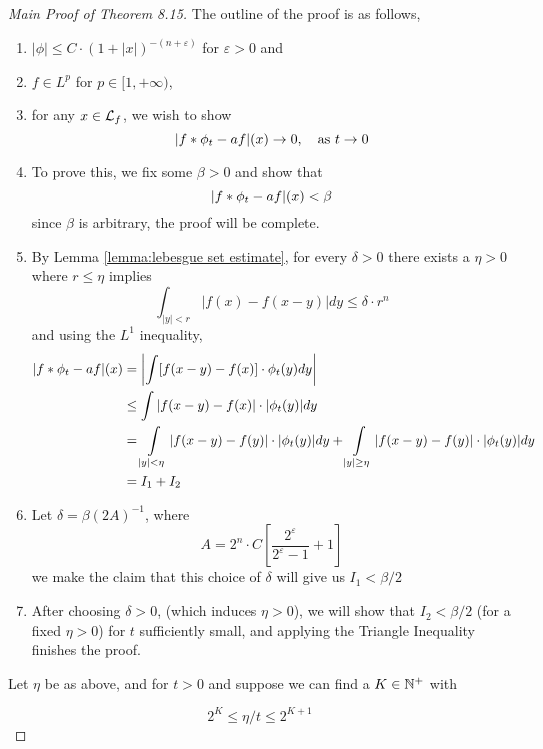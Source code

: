 \documentclass[../../main.tex]{subfiles}
\begin{document}
\begin{proof}[Main Proof of Theorem 8.15]
    The outline of the proof is as follows,
    \begin{enumerate}
        \item $|\phi|\leq C\cdot (1+|x|)^{-(n+\varepsilon)}$ for $\varepsilon>0$ and
        
        \item $f\in L^p$ for $p\in[1,+\infty)$,
        
        \item for any $x\in\mathcal{L}_f$, we wish to show \[|f\ast\phi_t - af|(x)\to 0,\quad\text{as }t \to 0\]
        
        \item To prove this, we fix some $\beta>0$ and show that\[|f\ast\phi_t - af|(x)<\beta\]
        since $\beta$ is arbitrary, the proof will be complete.

        \item By Lemma \ref{lemma:lebesgue set estimate}, for every $\delta>0$ there exists a $\eta>0$ where $r\leq \eta$ implies
        \[\int_{|y|<r}|f(x)-f(x-y)|dy\leq\delta\cdot r^n\] and using the $L^1$ inequality,
        \begin{align*}|f\ast\phi_t-af|(x)&=\left|\int [f(x-y)-f(x)]\cdot\phi_t(y)dy\right|\\
        &\leq\int |f(x-y)-f(x)|\cdot|\phi_t(y)|dy\\
        &=\int\limits_{|y|<\eta} |f(x-y)-f(y)|\cdot|\phi_t(y)|dy + \int\limits_{|y|\geq\eta} |f(x-y)-f(y)|\cdot|\phi_t(y)|dy\\
        &=I_1 +I_2
        \end{align*}
        
        \item Let $\delta = \beta(2A)^{-1}$, where 
        \[A = 2^n\cdot C\left[\dfrac{2^\varepsilon}{2^\varepsilon-1}+1\right]\]
        we make the claim that this choice of $\delta$ will give us $I_1<\beta/2$
        
        \item After choosing $\delta>0$, (which induces $\eta>0$), we will show that $I_2<\beta/2$ (for a fixed $\eta>0$) for $t$ sufficiently small, and applying the Triangle Inequality finishes the proof.
    \end{enumerate}
    Let $\eta$ be as above, and for $t>0$ and suppose we can find a $K\in\mathbb{N}^+$ with

    \begin{equation}\label{alpha estimate}
    2^K\leq \eta/t\leq 2^{K+1}
    \end{equation}


\end{proof}
\end{document}
